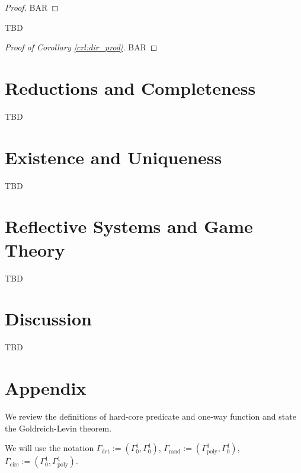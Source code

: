 \documentclass{article}
\numberwithin{equation}{section}
\theoremstyle{definition}
\theoremstyle{plain}
\begin{document}
\begin{proof}

BAR

\end{proof}

TBD

\begin{proof}[Proof of Corollary \ref{crl:dir_prod}]

BAR

\end{proof}

\section{Reductions and Completeness}
\label{sec:reductions}

TBD

\section{Existence and Uniqueness}
\label{sec:e_and_u}

TBD

\section{Reflective Systems and Game Theory}
\label{sec:reflective}

TBD

\section{Discussion}
\label{sec:discussion}

TBD

\appendix

\section{Appendix}

We review the definitions of hard-core predicate and one-way function and state the Goldreich-Levin theorem.

We will use the notation $\Gamma_{\text{det}}:=(\Gamma_0^1,\Gamma_0^1)$, $\Gamma_{\text{rand}}:=(\Gamma_{\text{poly}}^1,\Gamma_0^1)$, ${\Gamma_{\text{circ}}:=(\Gamma_0^1,\Gamma_{\text{poly}}^1)}$.
\end{document}
